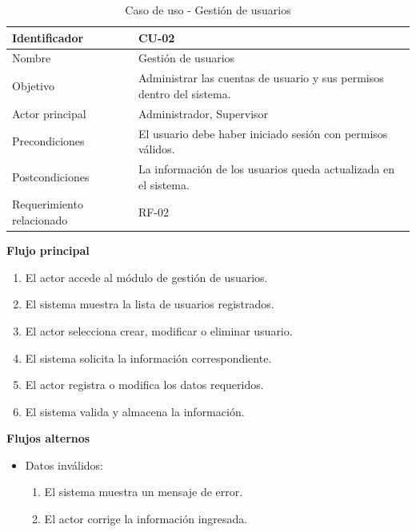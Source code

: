 \begin{table}[H]
    \centering
    \caption{Caso de uso - Gestión de usuarios}
    \label{tab:cu02}
    \begin{tabularx}{\textwidth}{|X|X|}
        \hline
        Identificador             & CU-02                                                                 \\ \hline
        Nombre                    & Gestión de usuarios                                                   \\ \hline
        Objetivo                  & Administrar las cuentas de usuario y sus permisos dentro del sistema. \\ \hline
        Actor principal           & Administrador, Supervisor                                             \\ \hline
        Precondiciones            & El usuario debe haber iniciado sesión con permisos válidos.           \\ \hline
        Postcondiciones           & La información de los usuarios queda actualizada en el sistema.       \\ \hline
        Requerimiento relacionado & RF-02                                                                 \\ \hline
    \end{tabularx}
\end{table}

\textbf{Flujo principal}

\begin{enumerate}
    \item El actor accede al módulo de gestión de usuarios.
    \item El sistema muestra la lista de usuarios registrados.
    \item El actor selecciona crear, modificar o eliminar usuario.
    \item El sistema solicita la información correspondiente.
    \item El actor registra o modifica los datos requeridos.
    \item El sistema valida y almacena la información.
\end{enumerate}

\textbf{Flujos alternos}

\begin{itemize}
    \item Datos inválidos:
          \begin{enumerate}
              \item El sistema muestra un mensaje de error.
              \item El actor corrige la información ingresada.
          \end{enumerate}
\end{itemize}

